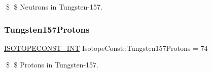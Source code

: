\$ \$ Neutrons in Tungsten-\/157. \mbox{\label{group___isotope_const-_tungsten-_w157_ga99da768838b8672fa4d883843a543d3a}} 
\subsubsection{\texorpdfstring{Tungsten157\+Protons}{Tungsten157Protons}}
{\footnotesize\ttfamily \mbox{\hyperlink{group___isotope_const-_macros_ga5f18360b3e99483a35c32d789e62621c}{I\+S\+O\+T\+O\+P\+E\+C\+O\+N\+S\+T\+\_\+\+I\+NT}} Isotope\+Const\+::\+Tungsten157\+Protons = 74}

\$ \$ Protons in Tungsten-\/157. 